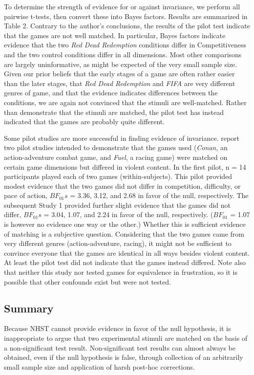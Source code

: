 \documentclass[fignum,nobf,man]{apa}
\begin{document}
To determine the strength of evidence for or against invariance, we perform all pairwise t-tests, then convert these into Bayes factors. Results are summarized in Table 2. Contrary to the author's conclusions, the results of the pilot test indicate that the games are not well matched. In particular, Bayes factors indicate evidence that the two {\em Red Dead Redemption} conditions differ in Competitiveness and the two control conditions differ in all dimensions. Most other comparisons are largely uninformative, as might be expected of the very small sample size. Given our prior beliefs that the early stages of a game are often rather easier than the later stages, that {\em Red Dead Redemption} and {\em FIFA} are very different genres of game, and that the evidence indicates differences between the conditions, we are again not convinced that the stimuli are well-matched. Rather than demonstrate that the stimuli are matched, the pilot test has instead indicated that the games are probably quite different. %

Some pilot studies are more successful in finding evidence of invariance. \citet{Adachi:Willoughby:2011} report two pilot studies intended to demonstrate that the games used ({\em Conan}, an action-adventure combat game, and {\em Fuel}, a racing game) were matched on certain game dimensions but differed in violent content. In the first pilot, n = 14 participants played each of two games (within-subjects). This pilot provided modest evidence that the two games did not differ in competition, difficulty, or pace of action, $BF_{01}s$ = 3.36, 3.12, and 2.68 in favor of the null, respectively. The subsequent Study 1 provided further slight evidence that the games did not differ, $BF_{01}s$ = 3.04, 1.07, and 2.24 in favor of the null, respectively. ($BF_{01}$ = 1.07 is however no evidence one way or the other.) Whether this is sufficient evidence of matching is a subjective question. Considering that the two games came from very different genres (action-adventure, racing), it might not be sufficient to convince everyone that the games are identical in all ways besides violent content. At least the pilot test did not indicate that the games instead differed. Note also that neither this study nor \citet{Valadez:Ferguson:2012} tested games for equivalence in frustration, so it is possible that other confounds exist but were not tested.

\subsection{Summary}
Because NHST cannot provide evidence in favor of the null hypothesis, it is inappropriate to argue that two experimental stimuli are matched on the basis of a non-significant test result.  Non-significant test results can almost always be obtained, even if the null hypothesis is false, through collection of an arbitrarily small sample size and application of harsh post-hoc corrections. 
\end{document}
